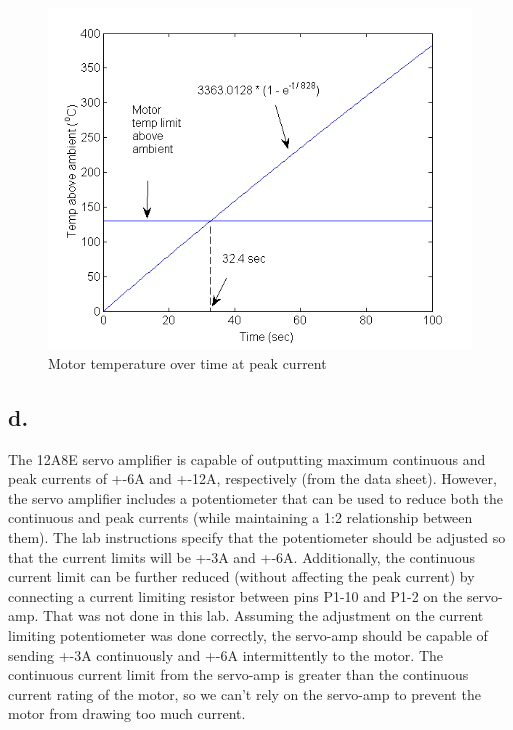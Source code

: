 \documentclass{article}
\theoremstyle{plain}
\theoremstyle{definition}
\theoremstyle{remark}
\begin{document}
\begin{figure}[htb]
\begin{center}
\includegraphics[width = 12cm]{temperature.png}
\caption{Motor temperature over time at peak current}
\label{temperature}
\end{center}
\end{figure}

\subsection*{d.}
The 12A8E servo amplifier is capable of outputting maximum continuous and peak currents of +-6A and +-12A, respectively (from the data sheet). However, the servo amplifier includes a potentiometer that can be used to reduce both the continuous and peak currents (while maintaining a 1:2 relationship between them). The lab instructions specify that the potentiometer should be adjusted so that the current limits will be +-3A and +-6A. Additionally, the continuous current limit can be further reduced (without affecting the peak current) by connecting a current limiting resistor between pins P1-10 and P1-2 on the servo-amp. That was not done in this lab. Assuming the adjustment on the current limiting potentiometer was done correctly, the servo-amp should be capable of sending +-3A continuously and +-6A intermittently to the motor. The continuous current limit from the servo-amp is greater than the continuous current rating of the motor, so we can't rely on the servo-amp to prevent the motor from drawing too much current.
\vspace{3 mm}
\end{document}
